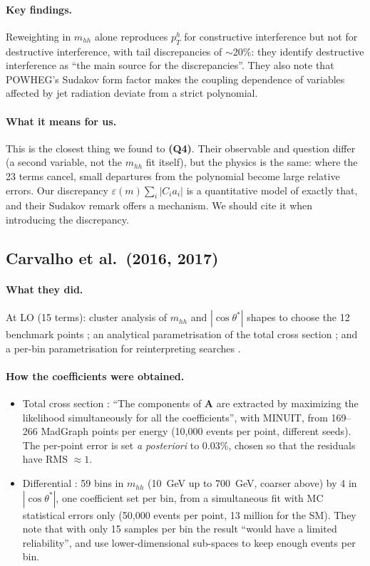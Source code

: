 \paragraph{Key findings.} Reweighting in $m_{hh}$ alone reproduces $p_T^h$ for constructive
interference but not for destructive interference, with tail discrepancies of $\sim$20\%:
they identify destructive interference as ``the main source for the discrepancies''. They
also note that POWHEG's Sudakov form factor makes the coupling dependence of variables
affected by jet radiation deviate from a strict polynomial.

\paragraph{What it means for us.} This is the closest thing we found to \textbf{(Q4)}. Their
observable and question differ (a second variable, not the $m_{hh}$ fit itself), but the
physics is the same: where the 23 terms cancel, small departures from the polynomial become
large relative errors. Our discrepancy $\varepsilon(m)\sum_i|C_ia_i|$ is a quantitative
model of exactly that, and their Sudakov remark offers a mechanism. We should cite it when
introducing the discrepancy.

\subsection{Carvalho et al.\ (2016, 2017) \cite{Carvalho2016,Carvalho2016b,Carvalho2017}}

\paragraph{What they did.} At LO (15 terms): cluster analysis of $m_{hh}$ and
$|\cos\theta^*|$ shapes to choose the 12 benchmark points \cite{Carvalho2016}; an analytical
parametrisation of the total cross section \cite{Carvalho2016b}; and a per-bin
parametrisation for reinterpreting searches \cite{Carvalho2017}.

\paragraph{How the coefficients were obtained.}
\begin{itemize}
  \item Total cross section \cite{Carvalho2016b}: ``The components of \textbf{A} are
    extracted by maximizing the likelihood simultaneously for all the coefficients'', with
    MINUIT, from 169--266 MadGraph points per energy (10,000 events per point, different
    seeds). The per-point error is set \emph{a posteriori} to 0.03\%, chosen so that the
    residuals have RMS $\approx 1$.
  \item Differential \cite{Carvalho2017}: 59 bins in $m_{hh}$ (10~GeV up to 700~GeV, coarser
    above) by 4 in $|\cos\theta^*|$, one coefficient set per bin, from a simultaneous fit with
    MC statistical errors only (50,000 events per point, 13 million for the SM). They
    note that with only 15 samples per bin the result ``would have a limited reliability'',
    and use lower-dimensional sub-spaces to keep enough events per bin.
\end{itemize}

